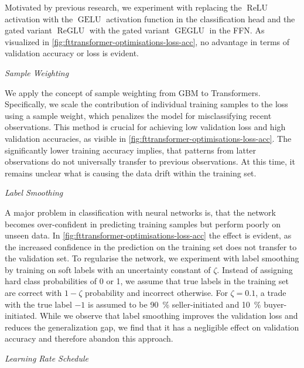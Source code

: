 Motivated by previous research, we experiment with replacing the $\operatorname{ReLU}$ activation with the $\operatorname{GELU}$ activation function \autocite[][2]{hendrycksGaussianErrorLinear2020} in the classification head and the gated variant $\operatorname{ReGLU}$ with the gated variant $\operatorname{GEGLU}$ \autocite[][2]{shazeerGLUVariantsImprove2020} in the \gls{FFN}. As visualized in \cref{fig:fttransformer-optimisations-loss-acc}, no advantage in terms of validation accuracy or loss is evident.

\emph{Sample Weighting}

We apply the concept of sample weighting from \gls{GBM} to Transformers. Specifically, we scale the contribution of individual training samples to the loss using a sample weight, which penalizes the model for misclassifying recent observations. This method is crucial for achieving low validation loss and high validation accuracies, as visible in \cref{fig:fttransformer-optimisations-loss-acc}. The significantly lower training accuracy implies, that patterns from latter observations do not universally transfer to previous observations. At this time, it remains unclear what is causing the data drift within the training set.

\emph{Label Smoothing}

A major problem in classification with neural networks is, that the network becomes over-confident in predicting training samples but perform poorly on unseen data. In \cref{fig:fttransformer-optimisations-loss-acc} the effect is evident, as the increased confidence in the prediction on the training set does not transfer to the validation set. To regularise the network, we experiment with label smoothing \autocite[][2823]{szegedyRethinkingInceptionArchitecture2016} by training on soft labels with an uncertainty constant of $\zeta$. Instead of assigning hard class probabilities of 0 or 1, we assume that true labels in the training set are correct with $1-\zeta$ probability and incorrect otherwise. For $\zeta=\num{0.1}$, a trade with the true label $-1$ is assumed to be \SI{90}{\percent} seller-initiated and \SI{10}{\percent} buyer-initiated. While we observe that label smoothing improves the validation loss and reduces the generalization gap, we find that it has a negligible effect on validation accuracy and therefore abandon this approach.

\emph{Learning Rate Schedule}

